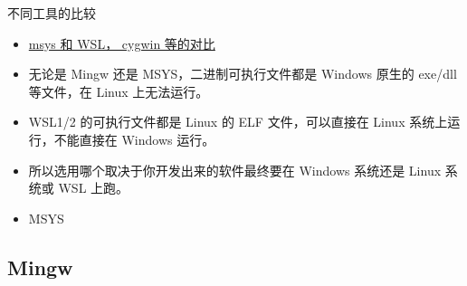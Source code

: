 
不同工具的比较
\begin{itemize}
\item \href{https://www.msys2.org/docs/what-is-msys2/}{msys 和 WSL， cygwin 等的对比}
\item 无论是 Mingw 还是 MSYS，二进制可执行文件都是 Windows 原生的 exe/dll 等文件，在 Linux 上无法运行。
\item WSL1/2 的可执行文件都是 Linux 的 ELF 文件，可以直接在 Linux 系统上运行，不能直接在 Windows 运行。
\item 所以选用哪个取决于你开发出来的软件最终要在 Windows 系统还是 Linux 系统或 WSL 上跑。
\item MSYS
\end{itemize}

\subsection{Mingw}
